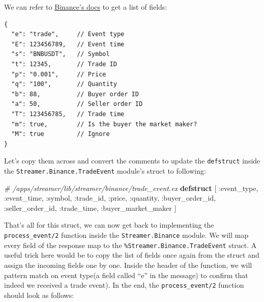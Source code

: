 \documentclass[
]{book}
\newenvironment{Shaded}{\begin{snugshade}}{\end{snugshade}}
\newcommand{\CommentTok}[1]{\textcolor[rgb]{0.56,0.35,0.01}{\textit{#1}}}
\newcommand{\KeywordTok}[1]{\textcolor[rgb]{0.13,0.29,0.53}{\textbf{#1}}}
\newcommand{\NormalTok}[1]{#1}
\newcommand{\VariableTok}[1]{\textcolor[rgb]{0.00,0.00,0.00}{#1}}
\begin{document}
We can refer to \href{https://github.com/binance/binance-spot-api-docs/blob/master/web-socket-streams.md\#trade-streams}{Binance's docs} to get a list of fields:

\begin{verbatim}
{
  "e": "trade",     // Event type
  "E": 123456789,   // Event time
  "s": "BNBUSDT",   // Symbol
  "t": 12345,       // Trade ID
  "p": "0.001",     // Price
  "q": "100",       // Quantity
  "b": 88,          // Buyer order ID
  "a": 50,          // Seller order ID
  "T": 123456785,   // Trade time
  "m": true,        // Is the buyer the market maker?
  "M": true         // Ignore
}
\end{verbatim}

Let's copy them across and convert the comments to update the \texttt{defstruct} inside the
\texttt{Streamer.Binance.TradeEvent} module's struct to following:

\begin{Shaded}
\begin{Highlighting}[]
  \CommentTok{\# /apps/streamer/lib/streamer/binance/trade\_event.ex}
  \KeywordTok{defstruct}\NormalTok{ [}
    \VariableTok{:event\_type}\NormalTok{,}
    \VariableTok{:event\_time}\NormalTok{,}
    \VariableTok{:symbol}\NormalTok{,}
    \VariableTok{:trade\_id}\NormalTok{,}
    \VariableTok{:price}\NormalTok{,}
    \VariableTok{:quantity}\NormalTok{,}
    \VariableTok{:buyer\_order\_id}\NormalTok{,}
    \VariableTok{:seller\_order\_id}\NormalTok{,}
    \VariableTok{:trade\_time}\NormalTok{,}
    \VariableTok{:buyer\_market\_maker}
\NormalTok{  ]}
\end{Highlighting}
\end{Shaded}

That's all for this struct, we can now get back to implementing the \texttt{process\_event/2} function inside the \texttt{Streamer.Binance} module. We will map every field of the response map to the \texttt{\%Streamer.Binance.TradeEvent} struct. A useful trick here would be to copy the list of fields once again from the struct and assign the incoming fields one by one.
Inside the header of the function, we will pattern match on event type(a field called ``e'' in the message) to confirm that indeed we received a trade event). In the end, the \texttt{process\_event/2} function should look as follows:
\end{document}

